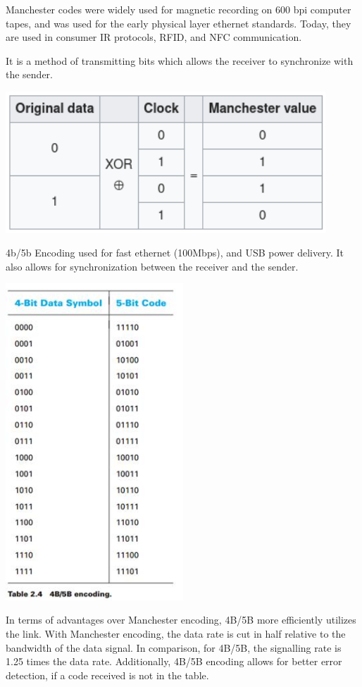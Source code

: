 Manchester codes were widely used for magnetic recording on 600 bpi computer
tapes, and was used for the early physical layer ethernet standards.
Today, they are used in consumer IR protocols, RFID, and NFC communication.

It is a method of transmitting bits which allows the receiver to synchronize
with the sender.\footnotemark



\includegraphics*[width=0.9\textwidth]{manchester.png}

4b/5b Encoding used for fast ethernet (100Mbps), and USB power delivery. It also
allows for synchronization between the receiver and the sender.\footnotemark
{}

\includegraphics*[width=0.5\textwidth]{4b5b.jpg}




In terms of advantages over Manchester encoding, 4B/5B more efficiently utilizes
the link. With Manchester encoding, the data rate is cut in half relative to the
bandwidth of the data signal.  In comparison, for 4B/5B, the signalling rate is
1.25 times the data rate. Additionally, 4B/5B encoding allows for better error
detection, if a code received is not in the table.
